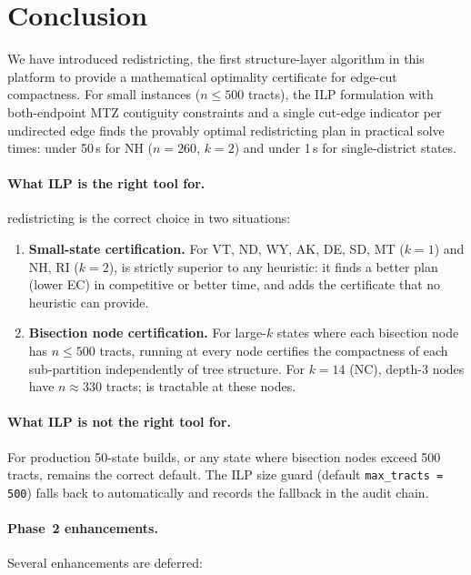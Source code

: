 \section{Conclusion}
\label{sec:conclusion}

We have introduced \ilp{} redistricting, the first structure-layer algorithm
in this platform to provide a mathematical optimality certificate for
edge-cut compactness.
For small instances ($n \leq 500$ tracts), the ILP formulation with
both-endpoint MTZ contiguity constraints and a single cut-edge indicator
per undirected edge finds the provably optimal redistricting plan in
practical solve times: under 50\,s for NH ($n=260$, $k=2$) and under
1\,s for single-district states.

\paragraph{What ILP is the right tool for.}
\ilp{} redistricting is the correct choice in two situations:

\begin{enumerate}
\item \textbf{Small-state certification.}
  For VT, ND, WY, AK, DE, SD, MT ($k=1$) and NH, RI ($k=2$), \ilp{}
  is strictly superior to any heuristic: it finds a better plan (lower EC)
  in competitive or better time, and adds the certificate that no heuristic
  can provide.

\item \textbf{Bisection node certification.}
  For large-$k$ states where each bisection node has $n \leq 500$ tracts,
  running \ilp{} at every node certifies the compactness of each sub-partition
  independently of tree structure.
  For $k = 14$ (NC), depth-3 nodes have $n \approx 330$ tracts; \ilp{}
  is tractable at these nodes.
\end{enumerate}

\paragraph{What ILP is not the right tool for.}
For production 50-state builds, or any state where bisection nodes exceed
500 tracts, \metis{} remains the correct default.
The ILP size guard (default \texttt{max\_tracts = 500}) falls back to
\metis{} automatically and records the fallback in the audit chain.

\paragraph{Phase~2 enhancements.}
Several enhancements are deferred:

